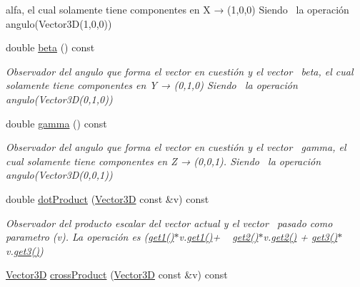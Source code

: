 \begin{Indent}
\begin{DoxyCompactItemize}
\begin{DoxyCompactList}
 alfa, el cual solamente tiene componentes en X → (1,0,0) Siendo~\newline
 la operación angulo(\+Vector3\+D(1,0,0)) \end{DoxyCompactList}\item 
double \mbox{\hyperlink{classed_1_1Vector3D_a0b9663bbc1b3c3237d0d83583b79597d}{beta}} () const
\begin{DoxyCompactList}\small\item\em Observador del angulo que forma el vector en cuestión y el vector~\newline
 beta, el cual solamente tiene componentes en Y → (0,1,0) Siendo~\newline
 la operación angulo(\+Vector3\+D(0,1,0)) \end{DoxyCompactList}\item 
double \mbox{\hyperlink{classed_1_1Vector3D_aeb55bfb591e508192eb11e63abbbac19}{gamma}} () const
\begin{DoxyCompactList}\small\item\em Observador del angulo que forma el vector en cuestión y el vector~\newline
 gamma, el cual solamente tiene componentes en Z → (0,0,1). Siendo~\newline
 la operación angulo(\+Vector3\+D(0,0,1)) \end{DoxyCompactList}\item 
double \mbox{\hyperlink{classed_1_1Vector3D_a849531cfc47ecc3feff503f33ecf76e8}{dot\+Product}} (\mbox{\hyperlink{classed_1_1Vector3D}{Vector3D}} const \&v) const
\begin{DoxyCompactList}\small\item\em Observador del producto escalar del vector actual y el vector~\newline
 pasado como parametro (v). La operación es (\mbox{\hyperlink{classed_1_1Vector3D_ac96497e7c082fde19b4998408e4ec36b}{get1()}}$\ast$v.\mbox{\hyperlink{classed_1_1Vector3D_ac96497e7c082fde19b4998408e4ec36b}{get1()}}+ ~\newline
 \mbox{\hyperlink{classed_1_1Vector3D_acb66f2ac0cb4f24592698fb317458e35}{get2()}}$\ast$v.\mbox{\hyperlink{classed_1_1Vector3D_acb66f2ac0cb4f24592698fb317458e35}{get2()}} + \mbox{\hyperlink{classed_1_1Vector3D_a50c08e3089bc1b0cd5de77d8f0086cc0}{get3()}}$\ast$v.\mbox{\hyperlink{classed_1_1Vector3D_a50c08e3089bc1b0cd5de77d8f0086cc0}{get3()}}) \end{DoxyCompactList}\item 
\mbox{\hyperlink{classed_1_1Vector3D}{Vector3D}} \mbox{\hyperlink{classed_1_1Vector3D_a0e1d07b0544bdce91f8eb2e1281a1613}{cross\+Product}} (\mbox{\hyperlink{classed_1_1Vector3D}{Vector3D}} const \&v) const

\end{DoxyCompactItemize}
\end{Indent}
